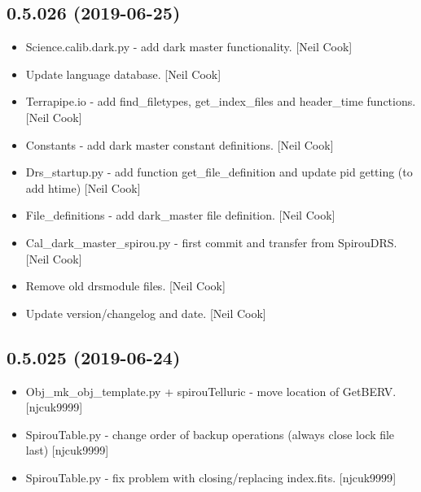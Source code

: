 \documentclass[a4paper,10pt,english]{report}
\begin{document}
\subsection{0.5.026 (2019-06-25)}
\label{\detokenize{misc/changelog:id109}}\begin{itemize}
\item {} 
Science.calib.dark.py - add dark master functionality. {[}Neil Cook{]}

\item {} 
Update language database. {[}Neil Cook{]}

\item {} 
Terrapipe.io - add find\_filetypes, get\_index\_files and header\_time
functions. {[}Neil Cook{]}

\item {} 
Constants - add dark master constant definitions. {[}Neil Cook{]}

\item {} 
Drs\_startup.py - add function get\_file\_definition and update pid
getting (to add htime) {[}Neil Cook{]}

\item {} 
File\_definitions - add dark\_master file definition. {[}Neil Cook{]}

\item {} 
Cal\_dark\_master\_spirou.py - first commit and transfer from SpirouDRS.
{[}Neil Cook{]}

\item {} 
Remove old drsmodule files. {[}Neil Cook{]}

\item {} 
Update version/changelog and date. {[}Neil Cook{]}

\end{itemize}


\subsection{0.5.025 (2019-06-24)}
\label{\detokenize{misc/changelog:id110}}\begin{itemize}
\item {} 
Obj\_mk\_obj\_template.py + spirouTelluric - move location of GetBERV.
{[}njcuk9999{]}

\item {} 
SpirouTable.py - change order of backup operations (always close lock
file last) {[}njcuk9999{]}

\item {} 
SpirouTable.py - fix problem with closing/replacing index.fits.
{[}njcuk9999{]}

\end{itemize}
\end{document}
